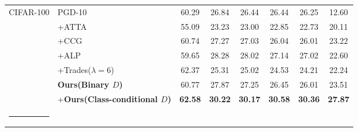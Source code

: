 \documentclass[10pt,twocolumn,letterpaper]{article}
\makeatletter
\def\hlinew#1{%
  \noalign{\ifnum0=`}\fi\hrule \@height #1 \futurelet
   \reserved@a\@xhline}
\makeatother
\begin{document}
\begin{table*}[!t]
\begin{tabular}{c|l|c|ccccc}
        \multirow{7}{*}{CIFAR-100} 
                  & PGD-10 ~\cite{madry2018towards}      & 60.29 & 26.84 & 26.44 & 26.44 & 26.25  &12.60 \\
                  & +ATTA~\cite{zheng2020efficient}     & 55.09 & 23.23 & 23.00 & 22.85 & 22.73  &20.11  \\
                  & +CCG~\cite{tack2021consistency}     & 60.74  & 27.27  & 27.03  & 26.04 & 26.01 &23.22 \\

                   
                   & +ALP~\cite{58kannan2018adversarial}  & 59.65 & 28.28 & 28.02 & 27.14 & 27.02  &22.60 \\
                  
                  & +Trades($\lambda=6$)~\cite{Zhang2019tradeoff}     & 62.37 & 25.31 & 25.02 & 24.53 & 24.21  & 22.24 \\
                  
                  
                  & \textbf{Ours(Binary $D$)}  &60.77 &27.87 &27.25 &26.45 &26.01 &23.51  \\
                  &  +\textbf{Ours(Class-conditional $D$)}  & \textbf{62.58} & \textbf{30.22} & \textbf{30.17} & \textbf{30.58} & \textbf{30.36}  & \textbf{27.87}   \\ 
                 \hlinew{1pt}
        \end{tabular}
        
    \end{table*}
    
    
 
    

  

\end{document}
